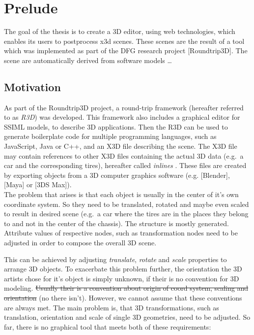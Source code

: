 
\section{Prelude}
\label{sec:Prelude}

The goal of the thesis is to create a 3D editor, using web technologies,
which enables its users to postprocess x3d scenes. These scenes are the
result of a tool which was implemented as part of the DFG research
project {[}Roundtrip3D{]}. The scene are automatically derived from
software models \ldots{}

\subsection{Motivation}\label{motivation}

As part of the Roundtrip3D project, a round-trip framework (hereafter
referred to as \emph{R3D}) was developed. This framework also includes a
graphical editor for SSIML models, to describe 3D applications. Then the
R3D can be used to generate boilerplate code for multiple programming
languages, such as JavaScript, Java or C++, and an X3D file describing
the scene. The X3D file may contain references to other X3D files
containing the actual 3D data (e.g.~a car and the corresponding tires),
hereafter called \emph{inlines} . These files are created by exporting
objects from a 3D computer graphics software (e.g. {[}Blender{]},
{[}Maya{]} or {[}3DS Max{]}).\\
The problem that arises is that each object is usually in the center of
it's own coordinate system. So they need to be translated, rotated and
maybe even scaled to result in desired scene (e.g.~a car where the tires
are in the places they belong to and not in the center of the chassis).
The structure is mostly generated. Attribute values of respective nodes,
such as transformation nodes need to be adjusted in order to compose the
overall 3D scene.


This can be achieved by adjusting \emph{translate}, \emph{rotate} and
\emph{scale} properties to arrange 3D objects. To exacerbate this
problem further, the orientation the 3D artists chose for it's object is
simply unknown, if their is no convention for 3D modeling. \sout{Usually
their is a convention about origin of coord system, scaling and
orientation} (no there isn't). However, we cannot assume that these
conventions are always met. The main problem is, that 3D
transformations, such as translation, orientation and scale of single 3D
geometries, need to be adjusted. So far, there is no graphical tool that
meets both of these requirements:

